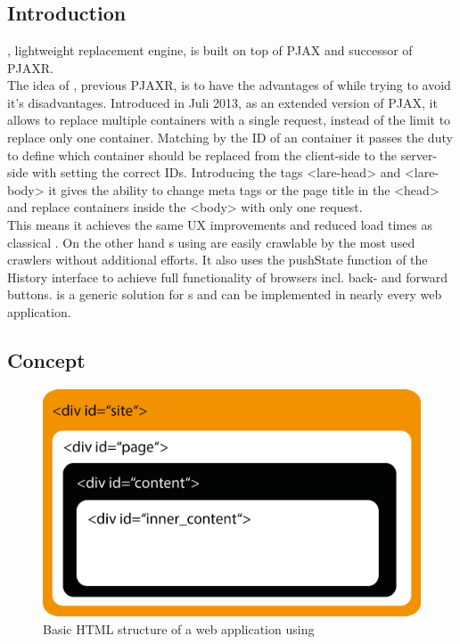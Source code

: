\section{\lare{}\label{lare}}
\subsection{Introduction}
\lare{}, lightweight \ajax{} replacement engine, is built on top of PJAX and successor of PJAXR.
\\
The idea of \lare{}, previous PJAXR, is to have the advantages of \ajax{} while trying to avoid it's disadvantages.
Introduced in Juli 2013, as an extended version of PJAX, it allows to replace multiple containers with a single request, instead of the limit to replace only one container.
Matching by the ID of an container it passes the duty to define which container should be replaced from the client-side to the server-side with setting the correct IDs.
Introducing the tags <lare-head> and <lare-body> it gives the ability to change meta tags or the page title in the <head> and replace containers inside the <body> with only one request.
\\
This means it achieves the same UX improvements and reduced load times as classical \ajax{}.
On the other hand \singlePageApplication{}s using \lare{} are easily crawlable by the most used crawlers without additional efforts.
It also uses the pushState function of the History interface to achieve full functionality of browsers incl. back- and forward buttons.
\lare{} is a generic solution for \singlePageApplication{}s and can be implemented in nearly every web application.

\subsection{Concept}

\begin{figure}[H]
\centering
\includegraphics[width=13cm]{images/lare_html.png}
\caption[lare_html]{Basic HTML structure of a web application using \lare{}}
\label{fig:lare_html}
\end{figure}

